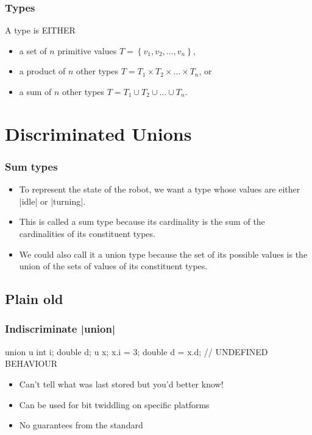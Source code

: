 \documentclass[aspectratio=169]{beamer}
\begin{document}
\begin{frame}
  \frametitle{Types}
  A \alert{type} is EITHER
  \begin{itemize}
  \item a set of $n$ primitive values $T = \left\{ v_1, v_2, \dots, v_n \right\}$,
  \item a \alert{product} of $n$ other types $T = T_1 \times T_2 \times \dots
    \times T_n$, or
  \item a \alert{sum} of $n$ other types $T = T_1 \cup T_2 \cup \dots \cup T_n$.
  \end{itemize}
\end{frame}

\section{Discriminated Unions}

\begin{frame}[fragile]
  \frametitle{Sum types}
  \begin{itemize}
  \item To represent the state of the robot, we want a type whose values are
    \alert{either} \cpp|idle| \alert{or} \cpp|turning|.
  \item This is called a \alert{sum type} because its cardinality is the sum of
    the cardinalities of its constituent types.
  \item We could also call it a \alert{union type} because the set of its
    possible values is the union of the sets of values of its constituent types.
  \end{itemize}
\end{frame}

\subsection{Plain old }

\begin{frame}[fragile]
  \frametitle{Indiscriminate \cpp|union|}
\begin{cppcode}
    union u {
      int i;
      double d;
    }
    u x;
    x.i = 3;
    double d = x.d; // UNDEFINED BEHAVIOUR
\end{cppcode}
  \begin{itemize}
  \item Can't tell what was last stored but you'd better know!
  \item Can be used for bit twiddling on specific platforms
  \item No guarantees from the standard
  \end{itemize}
\end{frame}
\end{document}
